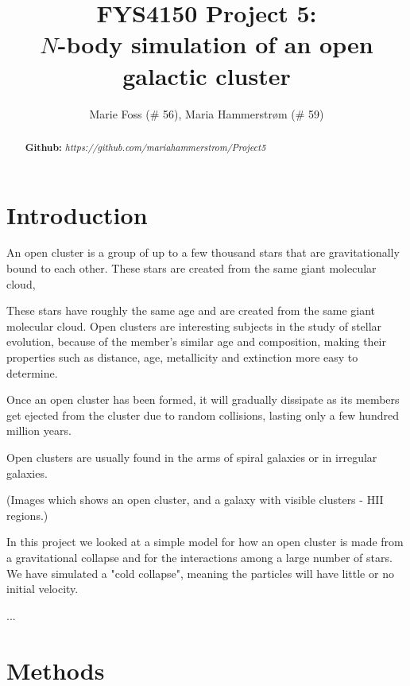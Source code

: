 \documentclass{article}
\title{\textbf{FYS4150 Project 5: \\$N$-body simulation of an open galactic cluster}}
\author{Marie Foss (\# 56), Maria Hammerstr{{\o}}m (\# 59)}
\date{}
\begin{document}
\maketitle

\begin{abstract}
	\noindent \lipsum[1]
	\vspace*{2ex}
	
	\noindent \textbf{Github:} \textit{https://github.com/mariahammerstrom/Project5}
	\vspace*{2ex}
\end{abstract}



\begin{multicols}{2}

\section{Introduction}

An open cluster is a group of up to a few thousand stars that are gravitationally bound to each other. These stars are created from the same giant molecular cloud, 

These stars have roughly the same age and are created from the same giant molecular cloud. Open clusters are interesting subjects in the study of stellar evolution, because of the member's similar age and composition, making their properties such as distance, age, metallicity and extinction more easy to determine. 

Once an open cluster has been formed, it will gradually dissipate as its members get ejected from the cluster due to random collisions, lasting only a few hundred million years.

Open clusters are usually found in the arms of spiral galaxies or in irregular galaxies. 

(Images which shows an open cluster, and a galaxy with visible clusters - HII regions.)

In this project we looked at a simple model for how an open cluster is made from a gravitational collapse and for the interactions among a large number of stars. We have simulated a "cold collapse", meaning the particles will have little or no initial velocity. 



...




\section{Methods}


\end{multicols}
\end{document}
